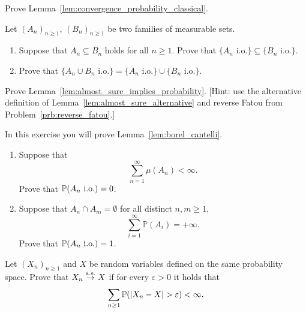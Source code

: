 \begin{problem}\label{prb:convergence_probability_classic}
Prove Lemma~\ref{lem:convergence_probability_classical}.
\end{problem}

\begin{problem}\label{prb:properties_io}
Let $(A_n)_{n \ge 1}$, $(B_n)_{n \ge 1}$ be two families of measurable sets. 
\begin{enumerate}[label={(\alph*)}]
\item Suppose that $A_n \subseteq B_n$ holds for all $n \ge 1$. Prove that $\{A_n \text{ i.o.}\} \subseteq \{B_n \text{ i.o.}\}$.
\item Prove that $\{A_n \cup B_n \text{ i.o.}\} = \{A_n \text{ i.o.}\} \cup \{B_n \text{ i.o.}\}$.
\end{enumerate}
\end{problem}

\begin{problem}\label{prb:almost_sure_implies_probability}
Prove Lemma~\ref{lem:almost_sure_implies_probability}. [Hint: use the alternative definition of Lemma~\ref{lem:almost_sure_alternative} and reverse Fatou from Problem~\ref{prb:reverse_fatou}.]
\end{problem}

\begin{problem}\label{prb:borel_cantelli}
In this exercise you will prove Lemma~\ref{lem:borel_cantelli}.

\begin{enumerate}[label={(\alph*)}]
\item Suppose that
\[
	\sum_{n=1}^\infty \mu(A_n) < \infty.
\]
Prove that $\mathbb P(A_n \text{ i.o.}) = 0$.
\item Suppose that $A_n \cap A_m = \emptyset$ for all distinct $n,m \ge 1$,
\[
	\sum_{i=1}^\infty \mathbb{P}(A_i) = +\infty.
\]
Prove that $\mathbb P(A_n \text{ i.o.}) = 1$.
\end{enumerate}
\end{problem}

\begin{problem}
Let $(X_n)_{n \ge 1}$ and $X$ be random variables defined on the same probability space. Prove that $X_n \stackrel{\mathrm{a.s.}}{\rightarrow} X$ if for every $\varepsilon > 0$ it holds that
\[
	\sum_{n \ge 1} \mathbb P(|X_n - X| > \varepsilon) < \infty.
\]
\end{problem}
